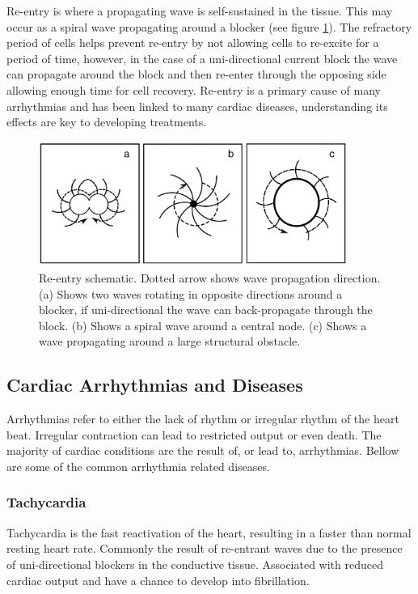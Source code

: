Re-entry is where a propagating wave is self-sustained in the tissue. This may occur as a spiral wave propagating around a blocker (see figure \ref{fig2.8}). The refractory period of cells helps prevent re-entry by not allowing cells to re-excite for a period of time, however, in the case of a uni-directional current block the wave can propagate around the block and then re-enter through the opposing side allowing enough time for cell recovery. Re-entry is a primary cause of many arrhythmias and has been linked to many cardiac diseases, understanding its effects are key to developing treatments. \par
\begin{figure}[h]
    \centering
    \includegraphics[width=0.9\textwidth]{images/reentry.png}
    \caption{Re-entry schematic. Dotted arrow shows wave propagation direction. (a) Shows two waves rotating in opposite directions around a blocker, if uni-directional the wave can back-propagate through the block. (b) Shows a spiral wave around a central node. (c) Shows a wave propagating around a large structural obstacle. \citep{phdpaper}}
    \label{fig2.8}
\end{figure}

\subsection{Cardiac Arrhythmias and Diseases}
Arrhythmias refer to either the lack of rhythm or irregular rhythm of the heart beat. Irregular contraction can lead to restricted output or even death. The majority of cardiac conditions are the result of, or lead to, arrhythmias. Bellow are some of the common arrhythmia related diseases.
\subsubsection{Tachycardia}
Tachycardia is the fast reactivation of the heart, resulting in a faster than normal resting heart rate. Commonly the result of re-entrant waves due to the presence of uni-directional blockers in the conductive tissue. Associated with reduced cardiac output and have a chance to develop into fibrillation.
